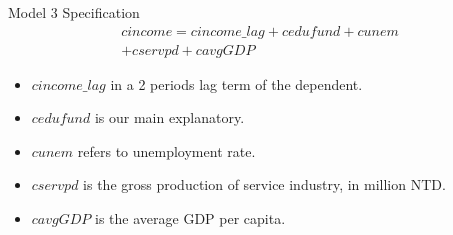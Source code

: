\documentclass[compress]{beamer}
\begin{document}
\begin{frame}{Model 3 Specification}
  \begin{multline}
    cincome = cincome\_lag + cedufund + cunem \\
    + cservpd + cavgGDP
  \end{multline}
  \begin{itemize}
    \item $cincome\_lag$ in a 2 periods lag term of the dependent.
    \item $cedufund$ is our main explanatory.
    \item $cunem$ refers to unemployment rate.
    \item $cservpd$ is the gross production of service industry, in million NTD.
    \item $cavgGDP$ is the average GDP per capita.
  \end{itemize}
\end{frame}
\end{document}

